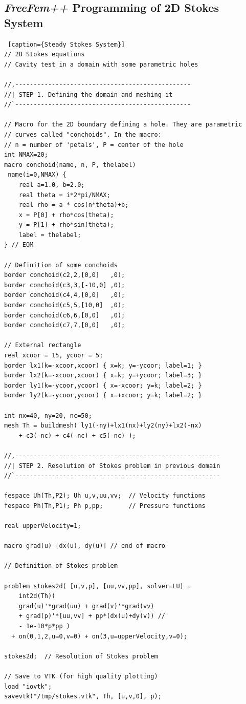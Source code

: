 \documentclass[12pt]{article}
\newcommand{\FF}{\textit{FreeFem++}\xspace}
\begin{document}
\subsection{\FF Programming of 2D Stokes System}

\lstset{language=freefem++}
\begin{lstlisting} [caption={Steady Stokes System}]
// 2D Stokes equations
// Cavity test in a domain with some parametric holes

//,------------------------------------------------
//| STEP 1. Defining the domain and meshing it
//`------------------------------------------------

// Macro for the 2D boundary defining a hole. They are parametric
// curves called "conchoids". In the macro:
// n = number of 'petals', P = center of the hole
int NMAX=20;
macro conchoid(name, n, P, thelabel)
 name(i=0,NMAX) {
    real a=1.0, b=2.0;
    real theta = i*2*pi/NMAX;
    real rho = a * cos(n*theta)+b;
    x = P[0] + rho*cos(theta);
    y = P[1] + rho*sin(theta);
    label = thelabel;
} // EOM

// Definition of some conchoids
border conchoid(c2,2,[0,0]   ,0);
border conchoid(c3,3,[-10,0] ,0);
border conchoid(c4,4,[0,0]   ,0);
border conchoid(c5,5,[10,0]  ,0);
border conchoid(c6,6,[0,0]   ,0);
border conchoid(c7,7,[0,0]   ,0);

// External rectangle
real xcoor = 15, ycoor = 5;
border lx1(k=-xcoor,xcoor) { x=k; y=-ycoor; label=1; }
border lx2(k=-xcoor,xcoor) { x=k; y=+ycoor; label=3; }
border ly1(k=-ycoor,ycoor) { x=-xcoor; y=k; label=2; }
border ly2(k=-ycoor,ycoor) { x=+xcoor; y=k; label=2; }

int nx=40, ny=20, nc=50;
mesh Th = buildmesh( ly1(-ny)+lx1(nx)+ly2(ny)+lx2(-nx)
    + c3(-nc) + c4(-nc) + c5(-nc) );

//,--------------------------------------------------------
//| STEP 2. Resolution of Stokes problem in previous domain
//`--------------------------------------------------------

fespace Uh(Th,P2); Uh u,v,uu,vv;  // Velocity functions
fespace Ph(Th,P1); Ph p,pp;       // Pressure functions

real upperVelocity=1;

macro grad(u) [dx(u), dy(u)] // end of macro

// Definition of Stokes problem

problem stokes2d( [u,v,p], [uu,vv,pp], solver=LU) =
    int2d(Th)(
	grad(u)'*grad(uu) + grad(v)'*grad(vv)
	+ grad(p)'*[uu,vv] + pp*(dx(u)+dy(v)) //'
	- 1e-10*p*pp )
  + on(0,1,2,u=0,v=0) + on(3,u=upperVelocity,v=0);

stokes2d;  // Resolution of Stokes problem

// Save to VTK (for high quality plotting)
load "iovtk";
savevtk("/tmp/stokes.vtk", Th, [u,v,0], p);
\end{lstlisting}
\end{document}
